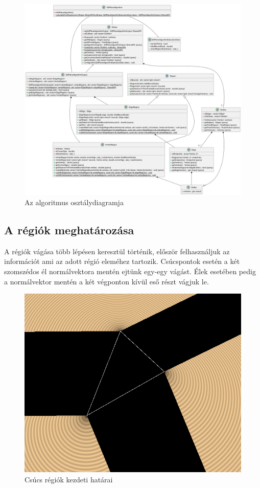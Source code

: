 \begin{figure}[H]
    \centering
    \includegraphics[width=1\linewidth]{images/class_algorithm.png}
    \caption{Az algoritmus osztálydiagramja}
    \label{fig:class_algorithm-1}
\end{figure}

\subsection{A régiók meghatározása}

A régiók vágása több lépésen keresztül történik, először felhasználjuk az információt ami az adott régió eleméhez tartozik. Csúcspontok esetén a két szomszédos él normálvektora mentén ejtünk egy-egy vágást. Élek esetében pedig a normálvektor mentén a két végponton kívül eső részt vágjuk le.

\begin{figure}[H]
    \centering
    \includegraphics[width=.6\linewidth]{images/initial_vertex_regions.png}
    \caption{Csúcs régiók kezdeti határai}
    \label{fig:initial_vertex_regions-1}
\end{figure}

